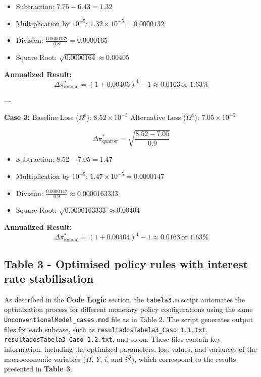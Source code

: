 \documentclass[12pt]{article}
\begin{document}
\begin{itemize}
    \item Subtraction: \(7.75 - 6.43 = 1.32\)
    \item Multiplication by \(10^{-5}\): \(1.32 \times 10^{-5} = 0.0000132\)
    \item Division: \(\frac{0.0000132}{0.8} = 0.0000165\)
    \item Square Root: \(\sqrt{0.0000164} \approx 0.00405\)
\end{itemize}


\textbf{Annualized Result:}  
\[
\Delta \pi^*_\text{annual} = \left(1 + 0.00406\right)^4 - 1 \approx 0.0163 \, \text{or } 1.63\%
\]

---

\textbf{Case 3:}  
Baseline Loss (\(\Omega^b\)): \(8.52 \times 10^{-5}\)  
Alternative Loss (\(\Omega^a\)): \(7.05 \times 10^{-5}\)  


\[
\Delta \pi^*_\text{quarter} = \sqrt{\frac{8.52 - 7.05}{0.9}}
\]

\begin{itemize}
    \item Subtraction: \(8.52 - 7.05 = 1.47\)
    \item Multiplication by \(10^{-5}\): \(1.47 \times 10^{-5} = 0.0000147\)
    \item Division: \(\frac{0.0000147}{0.9} \approx 0.0000163333\)
    \item Square Root: \(\sqrt{0.0000163333} \approx 0.00404\)
\end{itemize}



\textbf{Annualized Result:}  
\[
\Delta \pi^*_\text{annual} = \left(1 + 0.00404\right)^4 - 1 \approx 0.0163 \, \text{or } 1.63\%
\]











\subsection*{Table 3 - Optimised policy rules with interest rate stabilisation}

As described in the \textbf{Code Logic} section, the \texttt{tabela3.m} script automates the optimization process for different monetary policy configurations using the same \texttt{UnconventionalModel\_cases.mod} file as in Table 2. The script generates output files for each subcase, such as \texttt{resultadosTabela3\_Caso 1.1.txt}, \texttt{resultadosTabela3\_Caso 1.2.txt}, and so on. These files contain key information, including the optimized parameters, loss values, and variances of the macroeconomic variables (\(\Pi\), \(Y\), \(i\), and \(i^Q\)), which correspond to the results presented in \textbf{Table 3}.
\end{document}
